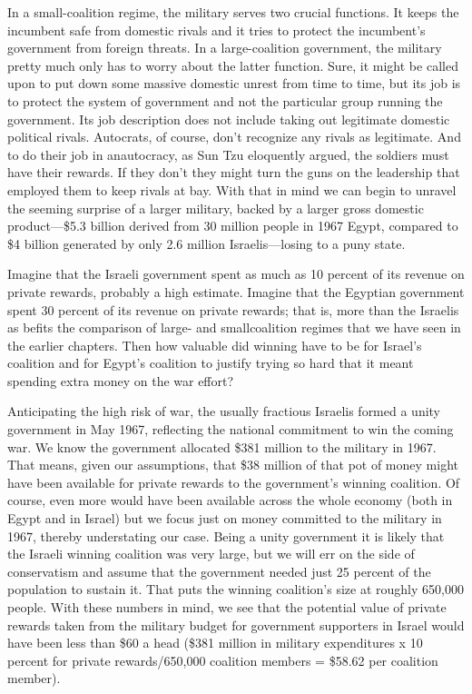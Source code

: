 \documentclass[10pt]{article}
\begin{document}
{\large In a small-coalition regime, the military serves two crucial functions.
It keeps the incumbent safe from domestic rivals and it tries to protect the
incumbent's government from foreign threats. In a large-coalition government, the
military pretty much only has to worry about the latter function. Sure, it might
be called upon to put down some massive domestic unrest from time to time, but
its job is to protect the system of government and not the particular group
running the government. Its job description does not include taking out
legitimate domestic political rivals. Autocrats, of course, don't recognize any
rivals as legitimate. And to do their job in anautocracy, as Sun Tzu eloquently
argued, the soldiers must have their rewards. If they don't they might turn the
guns on the leadership that employed them to keep rivals at bay. With that in
mind we can begin to unravel the seeming surprise of a larger military, backed by
a larger gross domestic product---\$5.3 billion derived from 30 million people in
1967 Egypt, compared to \$4 billion generated by only 2.6 million
Israelis---losing to a puny state.}

{\large Imagine that the Israeli government spent as much as 10 percent of its
revenue on private rewards, probably a high estimate. Imagine that the Egyptian
government spent 30 percent of its revenue on private rewards; that is, more than
the Israelis as befits the comparison of large- and smallcoalition regimes that
we have seen in the earlier chapters. Then how valuable did winning have to be
for Israel's coalition and for Egypt's coalition to justify trying so hard that
it meant spending extra money on the war effort?}

{\large Anticipating the high risk of war, the usually fractious Israelis formed
a unity government in May 1967, reflecting the national commitment to win the
coming war. We know the government allocated \$381 million to the military in
1967. That means, given our assumptions, that \$38 million of that pot of money
might have been available for private rewards to the government's winning
coalition. Of course, even more would have been available across the whole
economy (both in Egypt and in Israel) but we focus just on money committed to the
military in 1967, thereby understating our case. Being a unity government it is
likely that the Israeli winning coalition was very large, but we will err on the
side of conservatism and assume that the government needed just 25 percent of the
population to sustain it. That puts the winning coalition's size at roughly
650,000 people. With these numbers in mind, we see that the potential value of
private rewards taken from the military budget for government supporters in
Israel would have been less than \$60 a head (\$381 million in military
expenditures x 10 percent for private rewards/650,000 coalition members = \$58.62
per coalition member).}
\end{document}
